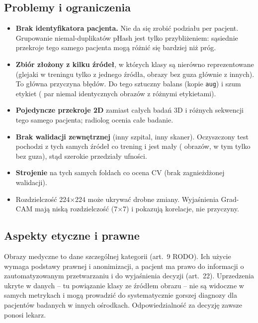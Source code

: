 \subsection*{Problemy i ograniczenia}
\begin{itemize}
\item \textbf{Brak identyfikatora pacjenta.} Nie da się zrobić podziału per pacjent.
  Grupowanie niemal-duplikatów pHash jest tylko przybliżeniem: sąsiednie przekroje tego
  samego pacjenta mogą różnić się bardziej niż próg.
\item \textbf{Zbiór złożony z kilku źródeł}, w których klasy są nierówno reprezentowane
  (glejaki w treningu tylko z jednego źródła, obrazy bez guza głównie z innych). To główna
  przyczyna błędów. Do tego sztuczny balans (kopie \texttt{aug}) i szum etykiet
  (\nPairsConflict{} par niemal identycznych obrazów z różnymi etykietami).
\item \textbf{Pojedyncze przekroje 2D} zamiast całych badań 3D i różnych sekwencji tego samego
  pacjenta; radiolog ocenia całe badanie.
\item \textbf{Brak walidacji zewnętrznej} (inny szpital, inny skaner). Oczyszczony test pochodzi
  z tych samych źródeł co trening i jest mały (\nTestDedup{} obrazów, w tym tylko \nDedupNotumor{}
  bez guza), stąd szerokie przedziały ufności.
\item \textbf{Strojenie} na tych samych foldach co ocena CV (brak zagnieżdżonej walidacji).
\item Rozdzielczość 224$\times$224 może ukrywać drobne zmiany. Wyjaśnienia Grad-CAM mają niską
  rozdzielczość (7$\times$7) i pokazują korelacje, nie przyczyny.
\end{itemize}

\subsection*{Aspekty etyczne i prawne}
Obrazy medyczne to dane szczególnej kategorii (art.~9 RODO). Ich użycie wymaga podstawy
prawnej i anonimizacji, a pacjent ma prawo do informacji o zautomatyzowanym przetwarzaniu
i do wyjaśnienia decyzji (art.~22). Uprzedzenia ukryte w danych -- tu powiązanie klasy ze
źródłem obrazu -- nie są widoczne w samych metrykach i mogą prowadzić do systematycznie
gorszej diagnozy dla pacjentów badanych w innych ośrodkach. Odpowiedzialność za decyzję
zawsze ponosi lekarz.

